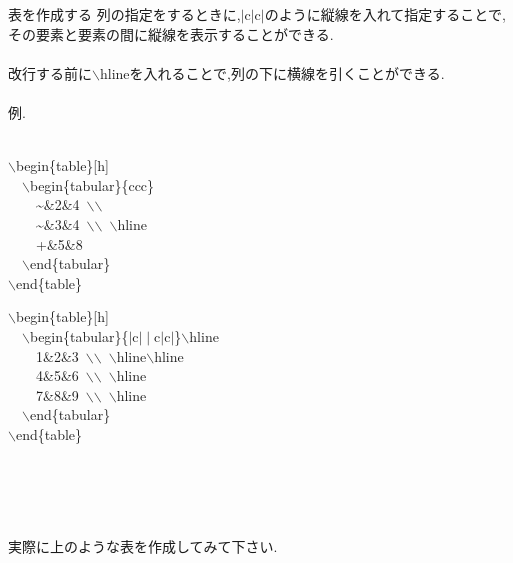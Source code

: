 \documentclass[dvipdfmx]{beamer}
\newcommand{\tbs}{$\backslash$}
\begin{document}
  \begin{frame}{表を作成する}
    \scriptsize
    列の指定をするときに,$\mid$c$\mid$c$\mid$のように縦線を入れて指定することで,
    その要素と要素の間に縦線を表示することができる.\\~\\
    改行する前に\tbs hlineを入れることで,列の下に横線を引くことができる.\\~\\
    例.\\~\\
    \centering
    \begin{minipage}[h]{4cm}
      \tbs begin\{table\}[h]\\
      ~~\tbs begin\{tabular\}\{ccc\}\\
      ~~~~\~{}\&2\&4~\tbs\tbs\\
      ~~~~\~{}\&3\&4~\tbs\tbs~\tbs hline\\
      ~~~~+\&5\&8\\
      ~~\tbs end\{tabular\}\\
      \tbs end\{table\}
    \end{minipage}
    \begin{minipage}[h]{4cm}
      \tbs begin\{table\}[h]\\
      ~~\tbs begin\{tabular\}\{$\mid$c$\mid\mid$c$\mid$c$\mid$\}\tbs hline\\
      ~~~~1\&2\&3~\tbs\tbs~\tbs hline\tbs hline \\
      ~~~~4\&5\&6~\tbs\tbs~\tbs hline \\
      ~~~~7\&8\&9~\tbs\tbs~\tbs hline \\
      ~~\tbs end\{tabular\}\\
      \tbs end\{table\}
    \end{minipage}
    ~\\~\\~\\~\\
    実際に上のような表を作成してみて下さい.
  \end{frame}
\end{document}
